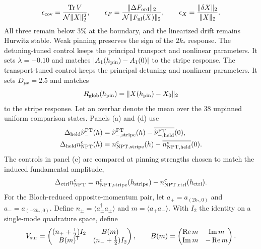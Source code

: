\documentclass[aps,prl,twocolumn,superscriptaddress,nofootinbib,floatfix]{revtex4-2}
\newcommand{\cN}{\mathcal N}
\begin{document}
\begin{equation}
 \epsilon_{\rm cov}=\frac{\operatorname{Tr}V}{\cN\|X\|_2^2},
 \qquad
 \epsilon_F=\frac{\|\Delta F_{\rm ord}\|_2}{\cN\|F_{\rm nl}(X)\|_2},
 \qquad
 \epsilon_X=\frac{\|\delta X\|_2}{\|X\|_2}.
 \label{eq:pinResponseRatiosS}
\end{equation}
All three remain below $3\%$ at the boundary, and the linearized drift remains Hurwitz stable. Weak pinning preserves the sign of the $2k_*$ response. The detuning-tuned control keeps the principal transport and nonlinear parameters. It sets $\lambda=-0.10$ and matches $|A_1(h_{\rm pin})-A_1(0)|$ to the stripe response. The transport-tuned control keeps the principal detuning and nonlinear parameters. It sets $D_{px}=2.5$ and matches
\begin{equation}
 R_{\rm glob}(h_{\rm pin})=\|X(h_{\rm pin})-X_0\|_2
 \label{eq:globalResponseNormS}
\end{equation}
to the stripe response. Let an overbar denote the mean over the 38 unpinned uniform comparison states. Panels (a) and (d) use
\begin{align}
 \Delta_{\rm held}\widetilde\nu_-^{\rm PT}(h)
 &=\widetilde\nu_{-,\rm stripe}^{\rm PT}(h)
 -\overline{\widetilde\nu_{-,\rm held}^{\rm PT}}(0),\nonumber\\
 \Delta_{\rm held}n_{\rm NPT}^{c}(h)
 &=n_{\rm NPT,stripe}^{c}(h)
 -\overline{n_{\rm NPT,held}^{c}}(0).
 \label{eq:heldDifferencesS}
\end{align}
The controls in panel (c) are compared at pinning strengths chosen to match the induced fundamental amplitude,
\begin{equation}
 \Delta_{\rm ctrl}n_{\rm NPT}^{c}
 =n_{\rm NPT,stripe}^{c}(h_{\rm stripe})
 -n_{\rm NPT,ctrl}^{c}(h_{\rm ctrl}).
 \label{eq:controlDifferenceS}
\end{equation}
For the Bloch-reduced opposite-momentum pair, let $a_+=a_{(2k_*,0)}$ and $a_-=a_{(-2k_*,0)}$. Define $n_\pm=\langle a_\pm^\dagger a_\pm\rangle$ and $m=\langle a_+a_-\rangle$. With $I_2$ the identity on a single-mode quadrature space, define
\begin{equation}
 V_{\rm sur}=\begin{pmatrix}
 (n_++\tfrac12)I_2&B(m)\\ B(m)^{\mathsf T}&(n_-+\tfrac12)I_2
 \end{pmatrix},
 \qquad
 B(m)=\begin{pmatrix}\operatorname{Re}m&\operatorname{Im}m\\\operatorname{Im}m&-\operatorname{Re}m\end{pmatrix}.
 \label{eq:pairingSurrogateS}
\end{equation}
\end{document}
